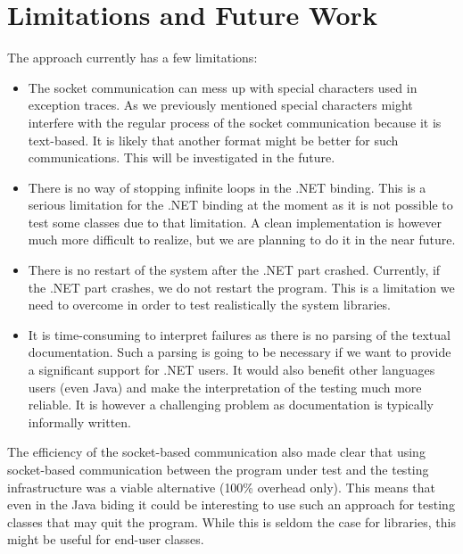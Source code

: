 \section{Limitations and Future Work}\label{sec:fut}

The approach currently has a few limitations:
\begin{itemize}
\item The socket communication can mess up with special characters used in exception traces. As we previously mentioned special characters might interfere with the regular process of the socket communication because it is text-based. It is likely that another format might be better for such communications. This will be investigated in the future.
\item There is no way of stopping infinite loops in the .NET binding. This is a serious limitation for the .NET binding at the moment as it is not possible to test some classes due to that limitation. A clean implementation is however much more difficult to realize, but we are planning to do it in the near future.
\item There is no restart of the system after the .NET part crashed. Currently, if the .NET part crashes, we do not restart the program. This is a limitation we need to overcome in order to test realistically the system libraries.
\item It is time-consuming to interpret failures as there is no parsing of the textual documentation.
Such a parsing is going to be necessary if we want to provide a significant support for .NET users.
It would also benefit other languages users (even Java) and make the interpretation of the testing much more reliable. It is however a challenging problem as documentation is typically informally written.
\end{itemize}

The efficiency of the socket-based communication also made clear that 
using socket-based communication between the program under test and the 
testing infrastructure was a viable alternative (100\% overhead only). 
This means that even in the Java biding it could be interesting to use 
such an approach for testing classes that may quit the program. While this 
is seldom the case for libraries, this might be useful for end-user classes.